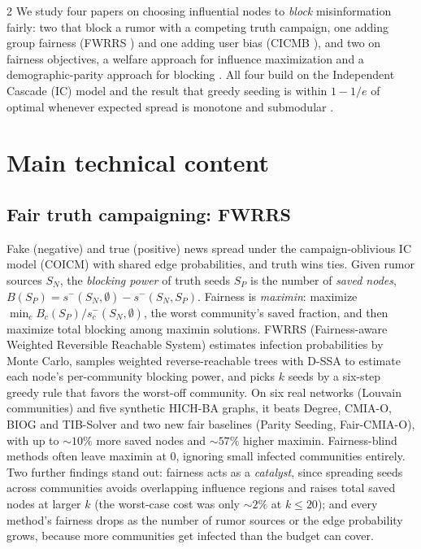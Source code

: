 \documentclass[11pt]{article}
\begin{document}
\begin{multicols}{2}
\noindent We study four papers on choosing influential nodes to \emph{block} misinformation fairly: two that block a rumor with a competing truth campaign, one adding group fairness (FWRRS \cite{fwrrs}) and one adding user bias (CICMB \cite{cicmb}), and two on fairness objectives, a welfare approach for influence maximization \cite{welfare} and a demographic-parity approach for blocking \cite{fang}. All four build on the Independent Cascade (IC) model and the result that greedy seeding is within $1-1/e$ of optimal whenever expected spread is monotone and submodular \cite{kleinberg}.

\section{Main technical content}

\subsection{Fair truth campaigning: FWRRS \cite{fwrrs}}
Fake (negative) and true (positive) news spread under the campaign-oblivious IC model (COICM) with shared edge probabilities, and truth wins ties. Given rumor sources $S_N$, the \emph{blocking power} of truth seeds $S_P$ is the number of \emph{saved nodes}, $B(S_P)=s^-(S_N,\emptyset)-s^-(S_N,S_P)$. Fairness is \emph{maximin}: maximize $\min_c B_c(S_P)/s^-_c(S_N,\emptyset)$, the worst community's saved fraction, and then maximize total blocking among maximin solutions. FWRRS (Fairness-aware Weighted Reversible Reachable System) estimates infection probabilities by Monte Carlo, samples weighted reverse-reachable trees with D-SSA to estimate each node's per-community blocking power, and picks $k$ seeds by a six-step greedy rule that favors the worst-off community. On six real networks (Louvain communities) and five synthetic HICH-BA graphs, it beats Degree, CMIA-O, BIOG and TIB-Solver and two new fair baselines (Parity Seeding, Fair-CMIA-O), with up to ${\sim}10\%$ more saved nodes and ${\sim}57\%$ higher maximin. Fairness-blind methods often leave maximin at $0$, ignoring small infected communities entirely. Two further findings stand out: fairness acts as a \emph{catalyst}, since spreading seeds across communities avoids overlapping influence regions and raises total saved nodes at larger $k$ (the worst-case cost was only ${\sim}2\%$ at $k\le20$); and every method's fairness drops as the number of rumor sources or the edge probability grows, because more communities get infected than the budget can cover.


\end{multicols}
\end{document}
